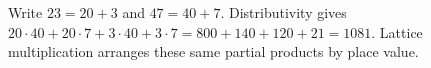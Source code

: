 Write $23=20+3$ and $47=40+7$. Distributivity gives $20\cdot40+20\cdot7+3\cdot40+3\cdot7=800+140+120+21=\boxed{1081}$. Lattice multiplication arranges these same partial products by place value.

